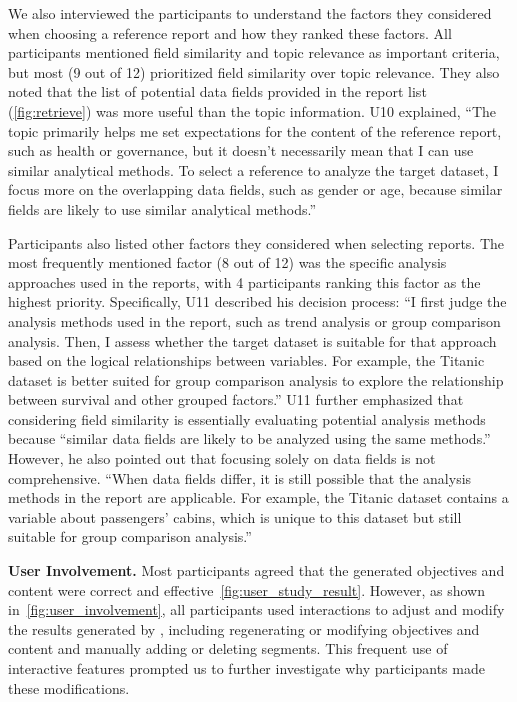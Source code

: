 We also interviewed the participants to understand the factors they considered when choosing a reference report and how they ranked these factors.
All participants mentioned field similarity and topic relevance as important criteria, but most (9 out of 12) prioritized field similarity over topic relevance.
They also noted that the list of potential data fields provided in the report list (\autoref{fig:retrieve}) was more useful than the topic information.
U10 explained, ``The topic primarily helps me set expectations for the content of the reference report, such as health or governance, but it doesn't necessarily mean that I can use similar analytical methods. To select a reference to analyze the target dataset, I focus more on the overlapping data fields, such as gender or age, because similar fields are likely to use similar analytical methods.''

Participants also listed other factors they considered when selecting reports.
The most frequently mentioned factor (8 out of 12) was the specific analysis approaches used in the reports, with 4 participants ranking this factor as the highest priority.
Specifically, U11 described his decision process: ``I first judge the analysis methods used in the report, such as trend analysis or group comparison analysis. Then, I assess whether the target dataset is suitable for that approach based on the logical relationships between variables. For example, the Titanic dataset is better suited for group comparison analysis to explore the relationship between survival and other grouped factors.''
U11 further emphasized that considering field similarity is essentially evaluating potential analysis methods because ``similar data fields are likely to be analyzed using the same methods.''
However, he also pointed out that focusing solely on data fields is not comprehensive. ``When data fields differ, it is still possible that the analysis methods in the report are applicable. For example, the Titanic dataset contains a variable about passengers' cabins, which is unique to this dataset but still suitable for group comparison analysis.''

\textbf{User Involvement. }
Most participants agreed that the generated objectives and content were correct and effective~\autoref{fig:user_study_result}.
However, as shown in~\autoref{fig:user_involvement}, all participants used interactions to adjust and modify the results generated by \system{}, including regenerating or modifying objectives and content and manually adding or deleting segments.
This frequent use of interactive features prompted us to further investigate why participants made these modifications.

